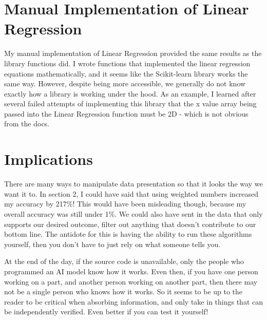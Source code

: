 \documentclass{article}
\begin{document}
\section{Manual Implementation of Linear Regression}

My manual implementation of Linear Regression provided the same results as the library functions did. I wrote functions that implemented the linear regression equations mathematically, and it seems like the Scikit-learn library works the same way. However, despite being more accessible, we generally do not know exactly how a library is working under the hood. As an example, I learned after several failed attempts of implementing this library that the x value array being passed into the Linear Regression function must be 2D - which is not obvious from the docs.

\section{Implications}

There are many ways to manipulate data presentation so that it looks the way we want it to. In section 2, I could have said that using weighted numbers increased my accuracy by 217\%! This would have been misleading though, because my overall accuracy was still under 1\%. We could also have sent in the data that only supports our desired outcome, filter out anything that doesn't contribute to our bottom line. The antidote for this is having the ability to run these algorithms yourself, then you don't have to just rely on what someone tells you. 

At the end of the day, if the source code is unavailable, only the people who programmed an AI model know how it works. Even then, if you have one person working on a part, and another person working on another part, then there may not be a single person who knows how it works. So it seems to be up to the reader to be critical when absorbing information, and only take in things that can be independently verified. Even better if you can test it yourself!
\end{document}
